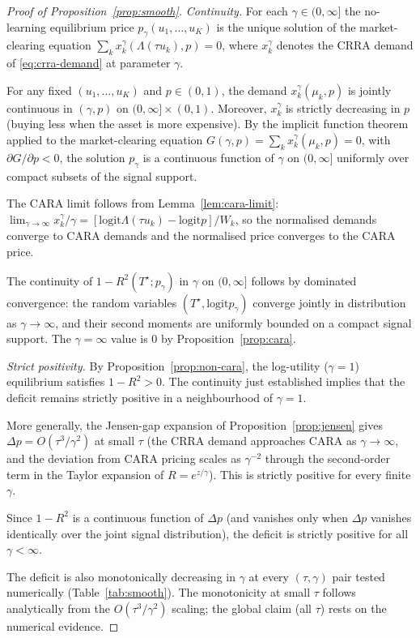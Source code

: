 \documentclass[12pt,letterpaper]{article}
\theoremstyle{definition}
\theoremstyle{remark}
\newcommand{\Lam}{\Lambda}            %
\newcommand{\logit}{\mathrm{logit}}
\newcommand{\Tstar}{T^{\!\star}}
\newcommand{\1}{\mathbf{1}}
\begin{document}
\begin{proof}[Proof of Proposition~\ref{prop:smooth}]
\emph{Continuity.} For each $\gamma\in(0,\infty]$ the no-learning
equilibrium price $p_{\gamma}(u_{1},\ldots,u_{K})$ is the unique solution
of the market-clearing equation
$\sum_{k}x_{k}^{\gamma}(\Lam(\tau u_{k}),p)=0$, where $x_{k}^{\gamma}$
denotes the CRRA demand of \eqref{eq:crra-demand} at parameter $\gamma$.

For any fixed $(u_{1},\ldots,u_{K})$ and $p\in(0,1)$, the demand
$x_{k}^{\gamma}(\mu_{k},p)$ is jointly continuous in $(\gamma,p)$ on
$(0,\infty]\times(0,1)$. Moreover, $x_{k}^{\gamma}$ is strictly
decreasing in $p$ (buying less when the asset is more expensive). By the
implicit function theorem applied to the market-clearing equation
$G(\gamma,p)=\sum_{k}x_{k}^{\gamma}(\mu_{k},p)=0$, with
$\partial G/\partial p<0$, the solution $p_{\gamma}$ is a continuous
function of $\gamma$ on $(0,\infty]$ uniformly over compact subsets of
the signal support.

The CARA limit follows from Lemma~\ref{lem:cara-limit}:
$\lim_{\gamma\to\infty}x_{k}^{\gamma}/\gamma
=[\logit\Lam(\tau u_{k})-\logit p]/W_{k}$, so the normalised demands
converge to CARA demands and the normalised price converges to the CARA
price.

The continuity of $1-R^{2}(\Tstar;p_{\gamma})$ in $\gamma$ on
$(0,\infty]$ follows by dominated convergence: the random variables
$(\Tstar, \logit p_{\gamma})$ converge jointly in distribution as
$\gamma\to\infty$, and their second moments are uniformly bounded on a
compact signal support. The $\gamma=\infty$ value is $0$ by
Proposition~\ref{prop:cara}.

\emph{Strict positivity.} By Proposition~\ref{prop:non-cara}, the
log-utility ($\gamma=1$) equilibrium satisfies $1-R^{2}>0$. The
continuity just established implies that the deficit remains strictly
positive in a neighbourhood of $\gamma=1$.

More generally, the Jensen-gap expansion of
Proposition~\ref{prop:jensen} gives
$\Delta p=O(\tau^{3}/\gamma^{2})$ at small $\tau$ (the CRRA demand
approaches CARA as $\gamma\to\infty$, and the deviation from CARA
pricing scales as $\gamma^{-2}$ through the second-order term in the
Taylor expansion of $R=e^{z/\gamma}$). This is strictly positive for
every finite $\gamma$.

Since $1-R^{2}$ is a continuous function of $\Delta p$ (and vanishes
only when $\Delta p$ vanishes identically over the joint signal
distribution), the deficit is strictly positive for all
$\gamma<\infty$.

The deficit is also monotonically decreasing in $\gamma$ at every
$(\tau,\gamma)$ pair tested numerically (Table~\ref{tab:smooth}).
The monotonicity at small $\tau$ follows analytically from the
$O(\tau^{3}/\gamma^{2})$ scaling; the global claim (all $\tau$) rests on
the numerical evidence.
\end{proof}
\end{document}
